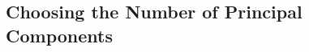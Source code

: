 % 
% 
% 
% 
% 
% 
% 
% 
% 
% 
% 
% 
% 

\subsection{Choosing the Number of Principal Components}  

